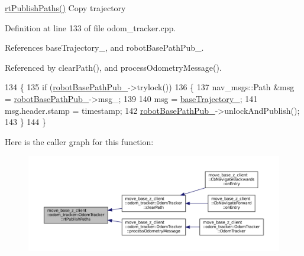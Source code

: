 \hyperlink{classmove__base__z__client_1_1odom__tracker_1_1OdomTracker_a6ee06474c7aea4423a7937c8ebc193ad}{rt\+Publish\+Paths()} Copy trajectory 

Definition at line 133 of file odom\+\_\+tracker.\+cpp.



References base\+Trajectory\+\_\+, and robot\+Base\+Path\+Pub\+\_\+.



Referenced by clear\+Path(), and process\+Odometry\+Message().


\begin{DoxyCode}
134 \{
135     \textcolor{keywordflow}{if} (\hyperlink{classmove__base__z__client_1_1odom__tracker_1_1OdomTracker_a3eb6ca9be9504dc3c1da949d1e1daeda}{robotBasePathPub\_}->trylock())
136     \{
137         nav\_msgs::Path &msg = \hyperlink{classmove__base__z__client_1_1odom__tracker_1_1OdomTracker_a3eb6ca9be9504dc3c1da949d1e1daeda}{robotBasePathPub\_}->msg\_;
139 
140         msg = \hyperlink{classmove__base__z__client_1_1odom__tracker_1_1OdomTracker_a83fa5a9bfe0b2683eee33444d3f030ea}{baseTrajectory\_};
141         msg.header.stamp = timestamp;
142         \hyperlink{classmove__base__z__client_1_1odom__tracker_1_1OdomTracker_a3eb6ca9be9504dc3c1da949d1e1daeda}{robotBasePathPub\_}->unlockAndPublish();
143     \}
144 \}
\end{DoxyCode}
Here is the caller graph for this function\+:
\nopagebreak
\begin{figure}[H]
\begin{center}
\leavevmode
\includegraphics[width=350pt]{classmove__base__z__client_1_1odom__tracker_1_1OdomTracker_a6ee06474c7aea4423a7937c8ebc193ad_icgraph}
\end{center}
\end{figure}
\mbox{\label{classmove__base__z__client_1_1odom__tracker_1_1OdomTracker_af567cbb995d224a9737ec9080c7d0f09}} 
